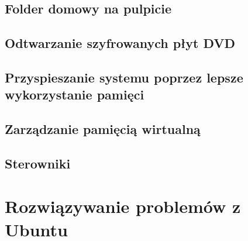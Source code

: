 \documentclass[a4paper,11pt,oneside]{mwart}
\begin{document}
		\subsection{Folder domowy na pulpicie}
			
		\subsection{Odtwarzanie szyfrowanych płyt DVD}
			
		\subsection{Przyspieszanie systemu poprzez lepsze wykorzystanie pamięci}
		\subsection{Zarządzanie pamięcią wirtualną}
		\subsection{Sterowniki} 
	\section{Rozwiązywanie problemów z Ubuntu}
\end{document}
